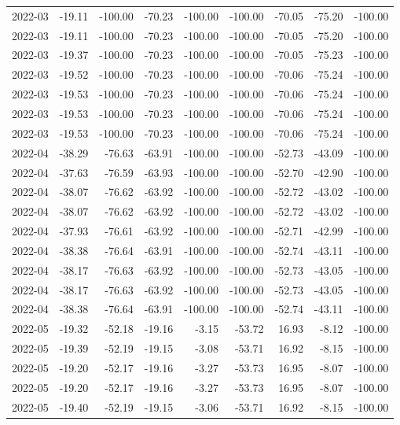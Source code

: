 \begin{table}[ht]
\begin{tabular}{lrrrrrrrr}
  2022-03 & -19.11 & -100.00 & -70.23 & -100.00 & -100.00 & -70.05 & -75.20 & -100.00 \\ 
  2022-03 & -19.11 & -100.00 & -70.23 & -100.00 & -100.00 & -70.05 & -75.20 & -100.00 \\ 
  2022-03 & -19.37 & -100.00 & -70.23 & -100.00 & -100.00 & -70.05 & -75.23 & -100.00 \\ 
  2022-03 & -19.52 & -100.00 & -70.23 & -100.00 & -100.00 & -70.06 & -75.24 & -100.00 \\ 
  2022-03 & -19.53 & -100.00 & -70.23 & -100.00 & -100.00 & -70.06 & -75.24 & -100.00 \\ 
  2022-03 & -19.53 & -100.00 & -70.23 & -100.00 & -100.00 & -70.06 & -75.24 & -100.00 \\ 
  2022-03 & -19.53 & -100.00 & -70.23 & -100.00 & -100.00 & -70.06 & -75.24 & -100.00 \\ 
  2022-04 & -38.29 & -76.63 & -63.91 & -100.00 & -100.00 & -52.73 & -43.09 & -100.00 \\ 
  2022-04 & -37.63 & -76.59 & -63.93 & -100.00 & -100.00 & -52.70 & -42.90 & -100.00 \\ 
  2022-04 & -38.07 & -76.62 & -63.92 & -100.00 & -100.00 & -52.72 & -43.02 & -100.00 \\ 
  2022-04 & -38.07 & -76.62 & -63.92 & -100.00 & -100.00 & -52.72 & -43.02 & -100.00 \\ 
  2022-04 & -37.93 & -76.61 & -63.92 & -100.00 & -100.00 & -52.71 & -42.99 & -100.00 \\ 
  2022-04 & -38.38 & -76.64 & -63.91 & -100.00 & -100.00 & -52.74 & -43.11 & -100.00 \\ 
  2022-04 & -38.17 & -76.63 & -63.92 & -100.00 & -100.00 & -52.73 & -43.05 & -100.00 \\ 
  2022-04 & -38.17 & -76.63 & -63.92 & -100.00 & -100.00 & -52.73 & -43.05 & -100.00 \\ 
  2022-04 & -38.38 & -76.64 & -63.91 & -100.00 & -100.00 & -52.74 & -43.11 & -100.00 \\ 
  2022-05 & -19.32 & -52.18 & -19.16 & -3.15 & -53.72 & 16.93 & -8.12 & -100.00 \\ 
  2022-05 & -19.39 & -52.19 & -19.15 & -3.08 & -53.71 & 16.92 & -8.15 & -100.00 \\ 
  2022-05 & -19.20 & -52.17 & -19.16 & -3.27 & -53.73 & 16.95 & -8.07 & -100.00 \\ 
  2022-05 & -19.20 & -52.17 & -19.16 & -3.27 & -53.73 & 16.95 & -8.07 & -100.00 \\ 
  2022-05 & -19.40 & -52.19 & -19.15 & -3.06 & -53.71 & 16.92 & -8.15 & -100.00 \\ 

\end{tabular}
\end{table}
